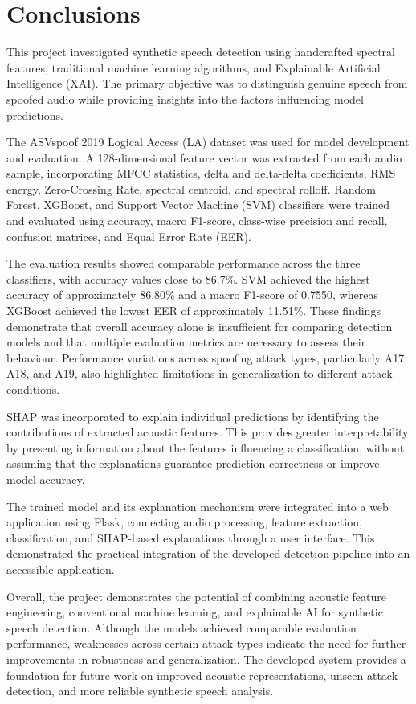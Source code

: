 \documentclass[12pt,a4paper]{report}
\begin{document}
\chapter{Conclusions}

This project investigated synthetic speech detection using handcrafted spectral features, traditional machine learning algorithms, and Explainable Artificial Intelligence (XAI). The primary objective was to distinguish genuine speech from spoofed audio while providing insights into the factors influencing model predictions.

The ASVspoof 2019 Logical Access (LA) dataset was used for model development and evaluation. A 128-dimensional feature vector was extracted from each audio sample, incorporating MFCC statistics, delta and delta-delta coefficients, RMS energy, Zero-Crossing Rate, spectral centroid, and spectral rolloff. Random Forest, XGBoost, and Support Vector Machine (SVM) classifiers were trained and evaluated using accuracy, macro F1-score, class-wise precision and recall, confusion matrices, and Equal Error Rate (EER).

The evaluation results showed comparable performance across the three classifiers, with accuracy values close to 86.7\%. SVM achieved the highest accuracy of approximately 86.80\% and a macro F1-score of 0.7550, whereas XGBoost achieved the lowest EER of approximately 11.51\%. These findings demonstrate that overall accuracy alone is insufficient for comparing detection models and that multiple evaluation metrics are necessary to assess their behaviour. Performance variations across spoofing attack types, particularly A17, A18, and A19, also highlighted limitations in generalization to different attack conditions.

SHAP was incorporated to explain individual predictions by identifying the contributions of extracted acoustic features. This provides greater interpretability by presenting information about the features influencing a classification, without assuming that the explanations guarantee prediction correctness or improve model accuracy.

The trained model and its explanation mechanism were integrated into a web application using Flask, connecting audio processing, feature extraction, classification, and SHAP-based explanations through a user interface. This demonstrated the practical integration of the developed detection pipeline into an accessible application.

Overall, the project demonstrates the potential of combining acoustic feature engineering, conventional machine learning, and explainable AI for synthetic speech detection. Although the models achieved comparable evaluation performance, weaknesses across certain attack types indicate the need for further improvements in robustness and generalization. The developed system provides a foundation for future work on improved acoustic representations, unseen attack detection, and more reliable synthetic speech analysis.
\end{document}
